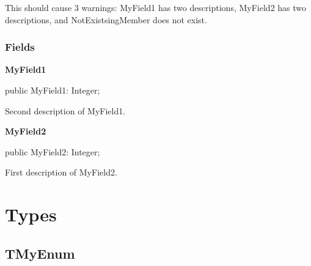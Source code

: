 \documentclass{report}
\newif\ifpdf
\begin{document}
This should cause 3 warnings: MyField1 has two descriptions, MyField2 has two descriptions, and NotExistsingMember does not exist.\subsubsection*{\large{\textbf{Fields}}\normalsize\hspace{1ex}\hfill}
\begin{list}{}{
\setlength{\itemindent}{0cm}
\setlength{\listparindent}{0cm}
\setlength{\leftmargin}{\evensidemargin}
\addtolength{\leftmargin}{\tmplength}
\settowidth{\labelsep}{X}
\addtolength{\leftmargin}{\labelsep}
\setlength{\labelwidth}{\tmplength}
}
\label{warning_value_member_tags.TMyClass-MyField1}
\item[\textbf{MyField1}\hfill]
\ifpdf
\begin{flushleft}
\fi
\begin{ttfamily}
public MyField1: Integer;\end{ttfamily}

\ifpdf
\end{flushleft}
\fi


\par Second description of MyField1.\label{warning_value_member_tags.TMyClass-MyField2}
\item[\textbf{MyField2}\hfill]
\ifpdf
\begin{flushleft}
\fi
\begin{ttfamily}
public MyField2: Integer;\end{ttfamily}

\ifpdf
\end{flushleft}
\fi


\par First description of MyField2.\end{list}
\section{Types}
\ifpdf
\subsection*{\large{\textbf{TMyEnum}}\normalsize\hspace{1ex}\hrulefill}
\else
\end{document}
